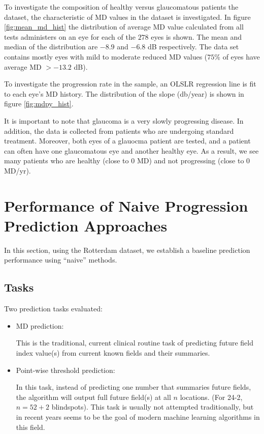 To investigate the composition of healthy versus glaucomatous patients the dataset, the characteristic of MD values in the dataset is investigated. In figure \ref{fig:mean_md_hist} the distribution of average MD value calculated from all tests administers on an eye for each of the $278$ eyes is shown. The mean and median of the distribution are $-8.9$ and $-6.8$ dB respectively. The data set contains mostly eyes with mild to moderate reduced MD values ($75\%$ of eyes have average MD $>-13.2$ dB).

To investigate the progression rate in the sample, an \ac{OLSLR} regression line is fit to each eye's MD history. The distribution of the slope (db/year) is shown in figure \ref{fig:mdpy_hist}. 

It is important to note that glaucoma is a very slowly progressing disease. In addition, the data is collected from patients who are undergoing standard treatment. Moreover, both eyes of a glauocma patient are tested, and a patient can often have one glaucomatous eye and another healthy eye. As a result, we see many patients who are healthy (close to $0$ MD) and not progressing (close to $0$ MD/yr).

\section{Performance of Naive Progression Prediction Approaches}

In this section, using the Rotterdam dataset, we establish a baseline prediction performance using ``naive'' methods. 

\subsection{Tasks}

Two prediction tasks evaluated:

\begin{itemize}
	\item \ac{MD} prediction:
	
	This is the traditional, current clinical routine task of predicting future field index value(s) from current known fields and their summaries. 
	
	\item Point-wise threshold prediction:
	
	In this task, instead of predicting one number that summaries future fields, the algorithm will output full future field(s) at all $n$ locations. (For 24-2, $n=52+2$ blindspots). This task is usually not attempted traditionally, but in recent years seems to be the goal of modern machine learning algorithms in this field.
	
\end{itemize}

